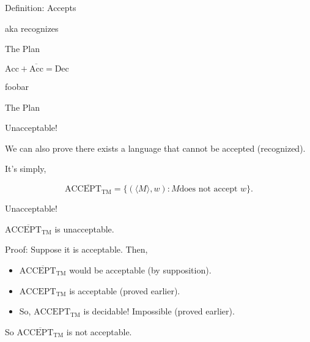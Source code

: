 \documentclass[12pt,compress]{beamer}
\begin{document}
\begin{frame}{Definition: Accepts}

  aka recognizes

\end{frame}

\begin{frame}{The Plan}

  

\end{frame}

\begin{frame}{$\text{Acc}+\overline{\text{Acc}}=\text{Dec}$}

  foobar

\end{frame}

\begin{frame}{The Plan}

  

\end{frame}

\begin{frame}{Unacceptable!}

  We can also prove there exists a language that cannot be accepted
  (recognized).

  \vskip 0.25in

  It's simply,

  \begin{equation*}
    \overline{\text{ACCEPT}_{\text{TM}}} = \{ (\langle M \rangle, w) : M \text{
      does not accept } w\}.
  \end{equation*}

\end{frame}

\begin{frame}{Unacceptable!}

  $\overline{\text{ACCEPT}_{\text{TM}}}$ is unacceptable.

  \vskip 0.25in

  Proof: Suppose it is acceptable. Then,

  \begin{itemize}

  \item $\overline{\text{ACCEPT}_{\text{TM}}}$ would be acceptable (by
    supposition).

  \item $\text{ACCEPT}_{\text{TM}}$ is acceptable (proved earlier).

  \item So, $\text{ACCEPT}_{\text{TM}}$ is decidable! Impossible (proved earlier).

  \end{itemize}

  So $\overline{\text{ACCEPT}_{\text{TM}}}$ is not acceptable.

\end{frame}
\end{document}
